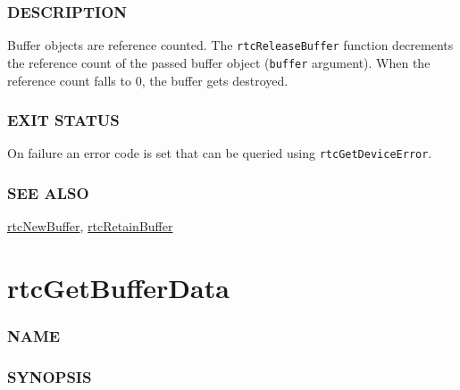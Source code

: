 \subsubsection{DESCRIPTION}\label{description}

Buffer objects are reference counted. The \texttt{rtcReleaseBuffer}
function decrements the reference count of the passed buffer object
(\texttt{buffer} argument). When the reference count falls to 0, the
buffer gets destroyed.

\subsubsection{EXIT STATUS}\label{exit-status}

On failure an error code is set that can be queried using
\texttt{rtcGetDeviceError}.

\subsubsection{SEE ALSO}\label{see-also}

\hyperref[rtcnewbuffer]{rtcNewBuffer},
\hyperref[rtcretainbuffer]{rtcRetainBuffer}

\pagebreak

\section{rtcGetBufferData}\label{rtcgetbufferdata}

\subsubsection{NAME}\label{name}

\begin{Shaded}
\begin{Highlighting}[]
\OperatorTok{{-}}
\end{Highlighting}
\end{Shaded}

\subsubsection{SYNOPSIS}\label{synopsis}

\begin{Shaded}
\begin{Highlighting}[]

\OperatorTok{*}\OperatorTok{(}\OperatorTok{);}
\end{Highlighting}
\end{Shaded}

